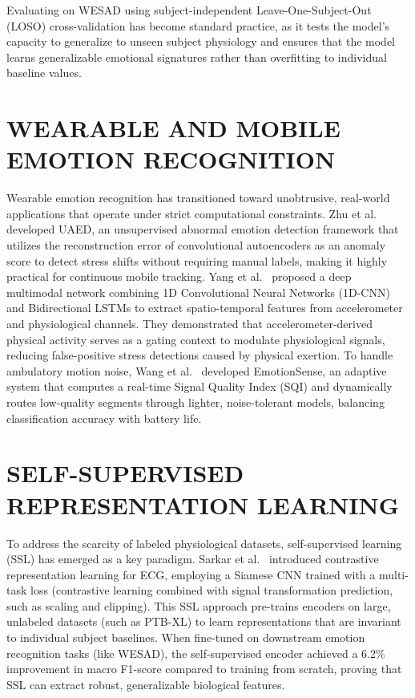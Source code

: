\documentclass[12pt, a4paper]{report}
\numberwithin{equation}{chapter}
\begin{document}
Evaluating on WESAD using subject-independent Leave-One-Subject-Out (LOSO) cross-validation has become standard practice, as it tests the model's capacity to generalize to unseen subject physiology and ensures that the model learns generalizable emotional signatures rather than overfitting to individual baseline values.


\section{WEARABLE AND MOBILE EMOTION RECOGNITION}
Wearable emotion recognition has transitioned toward unobtrusive, real-world applications that operate under strict computational constraints. Zhu et al.~\cite{zhu2023uaed} developed UAED, an unsupervised abnormal emotion detection framework that utilizes the reconstruction error of convolutional autoencoders as an anomaly score to detect stress shifts without requiring manual labels, making it highly practical for continuous mobile tracking. Yang et al.~\cite{yang2023behavioral} proposed a deep multimodal network combining 1D Convolutional Neural Networks (1D-CNN) and Bidirectional LSTMs to extract spatio-temporal features from accelerometer and physiological channels. They demonstrated that accelerometer-derived physical activity serves as a gating context to modulate physiological signals, reducing false-positive stress detections caused by physical exertion. To handle ambulatory motion noise, Wang et al.~\cite{wang2020emotionsense} developed EmotionSense, an adaptive system that computes a real-time Signal Quality Index (SQI) and dynamically routes low-quality segments through lighter, noise-tolerant models, balancing classification accuracy with battery life.

\section{SELF-SUPERVISED REPRESENTATION LEARNING}
To address the scarcity of labeled physiological datasets, self-supervised learning (SSL) has emerged as a key paradigm. Sarkar et al.~\cite{sarkar2022self} introduced contrastive representation learning for ECG, employing a Siamese CNN trained with a multi-task loss (contrastive learning combined with signal transformation prediction, such as scaling and clipping). This SSL approach pre-trains encoders on large, unlabeled datasets (such as PTB-XL) to learn representations that are invariant to individual subject baselines. When fine-tuned on downstream emotion recognition tasks (like WESAD), the self-supervised encoder achieved a 6.2\% improvement in macro F1-score compared to training from scratch, proving that SSL can extract robust, generalizable biological features.
\end{document}
